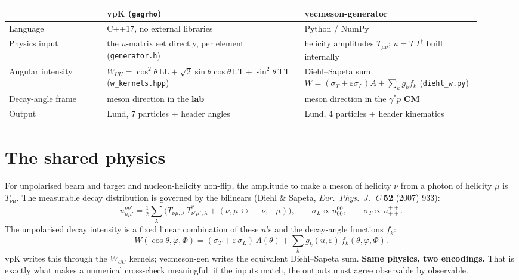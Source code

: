 \documentclass[11pt]{article}
\newcommand{\vpk}[1]{\textcolor{vpk}{#1}}
\newcommand{\ours}[1]{\textcolor{ours}{#1}}
\newcommand{\uij}[2]{u^{#1}_{#2}}
\begin{document}
\begin{center}\small
\begin{tabular}{@{}p{0.20\linewidth} p{0.36\linewidth} p{0.36\linewidth}@{}}
\toprule
 & \vpk{\textbf{vpK} (\texttt{gagrho})} & \ours{\textbf{vecmeson-generator}} \\
\midrule
Language & C++17, no external libraries & Python / NumPy \\
Physics input & the $u$-matrix set directly, per element (\texttt{generator.h}) & helicity amplitudes $T_{\mu\nu}$; $u=T\,T^{\dagger}$ built internally \\
Angular intensity & $W_{UU}=\cos^2\!\theta\,\mathrm{LL}+\sqrt2\sin\theta\cos\theta\,\mathrm{LT}+\sin^2\!\theta\,\mathrm{TT}$ (\texttt{w\_kernels.hpp}) & Diehl--Sapeta sum $W=(\sigma_T{+}\varepsilon\sigma_L)A+\sum_k g_k f_k$ (\texttt{diehl\_w.py}) \\
Decay-angle frame & meson direction in the \textbf{lab} & meson direction in the $\gamma^{*}p$ \textbf{CM} \\
Output & Lund, 7 particles + header angles & Lund, 4 particles + header kinematics \\
\bottomrule
\end{tabular}
\end{center}

\section{The shared physics}
For unpolarised beam and target and nucleon-helicity non-flip, the amplitude to make a meson of helicity
$\nu$ from a photon of helicity $\mu$ is $T_{\nu\mu}$. The measurable decay distribution is governed by the
bilinears (Diehl \& Sapeta, \textit{Eur.\ Phys.\ J.\ C} \textbf{52} (2007) 933):
\begin{equation}
\uij{\nu\nu'}{\mu\mu'}=\tfrac12\!\sum_{\lambda}\!\Big(T_{\nu\mu,\lambda}\,T^{*}_{\nu'\mu',\lambda}
+(\nu,\mu\!\leftrightarrow\!-\nu,-\mu)\Big),\qquad
\sigma_L\propto \uij{00}{00},\qquad \sigma_T\propto \uij{++}{++}.
\end{equation}
The unpolarised decay intensity is a fixed linear combination of these $u$'s and the decay-angle functions
$f_k$:
\begin{equation}
W(\cos\theta,\varphi,\Phi)=(\sigma_T+\varepsilon\,\sigma_L)\,A(\theta)+\sum_k g_k(u,\varepsilon)\,f_k(\theta,\varphi,\Phi).
\end{equation}
vpK writes this through the $W_{UU}$ kernels; vecmeson-gen writes the equivalent Diehl--Sapeta sum.
\textbf{Same physics, two encodings.} That is exactly what makes a numerical cross-check meaningful: if the
inputs match, the outputs must agree observable by observable.
\end{document}
